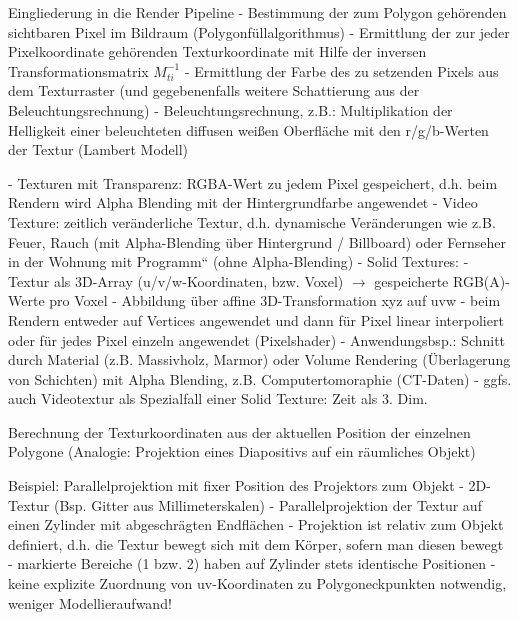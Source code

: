 \documentclass[10pt,landscape]{article}
\begin{document}
\begin{multicols}{3}
  Eingliederung in die Render Pipeline
  - Bestimmung der zum Polygon gehörenden sichtbaren Pixel im Bildraum (Polygonfüllalgorithmus)
  - Ermittlung der zur jeder Pixelkoordinate gehörenden Texturkoordinate mit Hilfe der inversen Transformationsmatrix $M_{ti}^{-1}$
  - Ermittlung der Farbe des zu setzenden Pixels aus dem Texturraster (und gegebenenfalls weitere Schattierung aus der Beleuchtungsrechnung)
  - Beleuchtungsrechnung, z.B.: Multiplikation der Helligkeit einer beleuchteten diffusen weißen Oberfläche mit den r/g/b-Werten der Textur (Lambert Modell)
  
  
  - Texturen mit Transparenz: RGBA-Wert zu jedem Pixel gespeichert, d.h. beim Rendern wird Alpha Blending mit der Hintergrundfarbe angewendet
  - Video Texture: zeitlich veränderliche Textur, d.h. dynamische Veränderungen wie z.B. Feuer, Rauch (mit Alpha-Blending über Hintergrund / Billboard) oder Fernseher in der Wohnung mit Programm“ (ohne Alpha-Blending)
  - Solid Textures:
  - Textur als 3D-Array (u/v/w-Koordinaten, bzw. Voxel) $\rightarrow$ gespeicherte RGB(A)-Werte pro Voxel
  - Abbildung über affine 3D-Transformation xyz auf uvw
  - beim Rendern entweder auf Vertices angewendet und dann für Pixel linear interpoliert oder für jedes Pixel einzeln angewendet (Pixelshader)
  - Anwendungsbsp.: Schnitt durch Material (z.B. Massivholz, Marmor) oder Volume Rendering (Überlagerung von Schichten) mit Alpha Blending, z.B. Computertomoraphie (CT-Daten)
  - ggfs. auch Videotextur als Spezialfall einer Solid Texture: Zeit als 3. Dim.
  
  Berechnung der Texturkoordinaten aus der aktuellen Position der einzelnen Polygone (Analogie: Projektion eines Diapositivs auf ein räumliches Objekt)
  
  Beispiel: Parallelprojektion mit fixer Position des Projektors zum Objekt
  - 2D-Textur (Bsp. Gitter aus Millimeterskalen)
  - Parallelprojektion der Textur auf einen Zylinder mit abgeschrägten Endflächen
  - Projektion ist relativ zum Objekt definiert, d.h. die Textur bewegt sich mit dem Körper, sofern man diesen bewegt
  - markierte Bereiche (1 bzw. 2) haben auf Zylinder stets identische Positionen
  - keine explizite Zuordnung von uv-Koordinaten zu Polygoneckpunkten notwendig, weniger Modellieraufwand!
  

\end{multicols}
\end{document}
